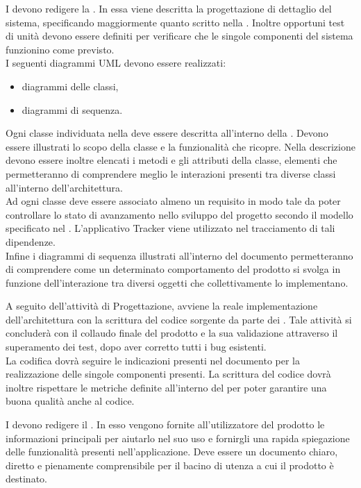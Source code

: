 \documentclass[a4paper, titlepage]{article}
\begin{document}
I  devono redigere la . In essa viene descritta la progettazione di dettaglio del sistema, specificando maggiormente quanto scritto nella . Inoltre opportuni test di unità devono essere definiti per verificare che le singole componenti del sistema funzionino come previsto.
\\ I seguenti diagrammi UML devono essere realizzati:
\begin{itemize}
	\item diagrammi delle classi,
	\item diagrammi di sequenza.
\end{itemize}
Ogni classe individuata nella  deve essere descritta all'interno della . Devono essere illustrati lo scopo della classe e la funzionalità che ricopre. Nella descrizione devono essere inoltre elencati i metodi e gli attributi della classe, elementi che permetteranno di comprendere meglio le interazioni presenti tra diverse classi all'interno dell'architettura.
\\ Ad ogni classe deve essere associato almeno un requisito in modo tale da poter controllare lo stato di avanzamento nello sviluppo del progetto secondo il modello specificato nel . L'applicativo Tracker viene utilizzato nel tracciamento di tali dipendenze.
\\ Infine i diagrammi di sequenza illustrati all'interno del documento permetteranno di comprendere come un determinato comportamento del prodotto si svolga in funzione dell'interazione tra diversi oggetti che collettivamente lo implementano.

A seguito dell'attività di Progettazione, avviene la reale implementazione dell'architettura con la scrittura del codice sorgente da parte dei . Tale attività si concluderà con il collaudo finale del prodotto e la sua validazione attraverso il superamento dei test, dopo aver corretto tutti i bug esistenti.
\\ La codifica dovrà seguire le indicazioni presenti nel documento  per la realizzazione delle singole componenti presenti. La scrittura del codice dovrà inoltre rispettare le metriche definite all'interno del  per poter garantire una buona qualità anche al codice.

I  devono redigere il . In esso vengono fornite all'utilizzatore del prodotto le informazioni principali per aiutarlo nel suo uso e fornirgli una rapida spiegazione delle funzionalità presenti nell'applicazione. Deve essere un documento chiaro, diretto e pienamente comprensibile per il bacino di utenza a cui il prodotto è destinato.
\end{document}
